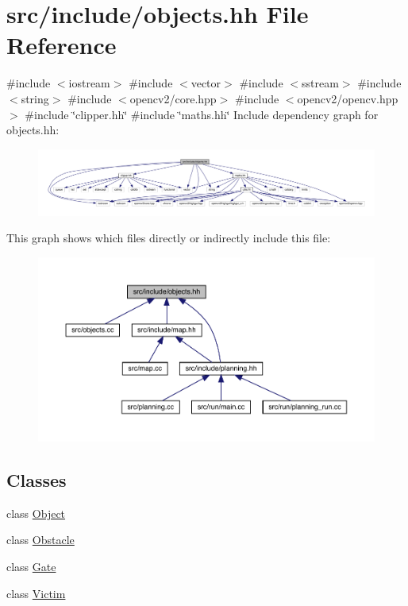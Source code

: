 \hypertarget{objects_8hh}{}\section{src/include/objects.hh File Reference}
\label{objects_8hh}
{\ttfamily \#include $<$iostream$>$}\newline
{\ttfamily \#include $<$vector$>$}\newline
{\ttfamily \#include $<$sstream$>$}\newline
{\ttfamily \#include $<$string$>$}\newline
{\ttfamily \#include $<$opencv2/core.\+hpp$>$}\newline
{\ttfamily \#include $<$opencv2/opencv.\+hpp$>$}\newline
{\ttfamily \#include \char`\"{}clipper.\+hh\char`\"{}}\newline
{\ttfamily \#include \char`\"{}maths.\+hh\char`\"{}}\newline
Include dependency graph for objects.\+hh\+:
\nopagebreak
\begin{figure}[H]
\begin{center}
\leavevmode
\includegraphics[width=350pt]{objects_8hh__incl}
\end{center}
\end{figure}
This graph shows which files directly or indirectly include this file\+:
\nopagebreak
\begin{figure}[H]
\begin{center}
\leavevmode
\includegraphics[width=350pt]{objects_8hh__dep__incl}
\end{center}
\end{figure}
\subsection*{Classes}
\begin{DoxyCompactItemize}
\item 
class \mbox{\hyperlink{class_object}{Object}}
\item 
class \mbox{\hyperlink{class_obstacle}{Obstacle}}
\item 
class \mbox{\hyperlink{class_gate}{Gate}}
\item 
class \mbox{\hyperlink{class_victim}{Victim}}
\end{DoxyCompactItemize}
